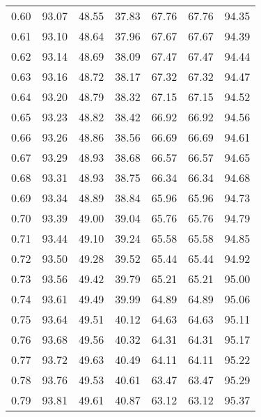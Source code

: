 \begin{tabular}{|c|c|c|c|c|c|c|}
      0.60 &     93.07 &     48.55 &      37.83 &   67.76 &      67.76 &         94.35 \\
      0.61 &     93.10 &     48.64 &      37.96 &   67.67 &      67.67 &         94.39 \\
      0.62 &     93.14 &     48.69 &      38.09 &   67.47 &      67.47 &         94.44 \\
      0.63 &     93.16 &     48.72 &      38.17 &   67.32 &      67.32 &         94.47 \\
      0.64 &     93.20 &     48.79 &      38.32 &   67.15 &      67.15 &         94.52 \\
      0.65 &     93.23 &     48.82 &      38.42 &   66.92 &      66.92 &         94.56 \\
      0.66 &     93.26 &     48.86 &      38.56 &   66.69 &      66.69 &         94.61 \\
      0.67 &     93.29 &     48.93 &      38.68 &   66.57 &      66.57 &         94.65 \\
      0.68 &     93.31 &     48.93 &      38.75 &   66.34 &      66.34 &         94.68 \\
      0.69 &     93.34 &     48.89 &      38.84 &   65.96 &      65.96 &         94.73 \\
      0.70 &     93.39 &     49.00 &      39.04 &   65.76 &      65.76 &         94.79 \\
      0.71 &     93.44 &     49.10 &      39.24 &   65.58 &      65.58 &         94.85 \\
      0.72 &     93.50 &     49.28 &      39.52 &   65.44 &      65.44 &         94.92 \\
      0.73 &     93.56 &     49.42 &      39.79 &   65.21 &      65.21 &         95.00 \\
      0.74 &     93.61 &     49.49 &      39.99 &   64.89 &      64.89 &         95.06 \\
      0.75 &     93.64 &     49.51 &      40.12 &   64.63 &      64.63 &         95.11 \\
      0.76 &     93.68 &     49.56 &      40.32 &   64.31 &      64.31 &         95.17 \\
      0.77 &     93.72 &     49.63 &      40.49 &   64.11 &      64.11 &         95.22 \\
      0.78 &     93.76 &     49.53 &      40.61 &   63.47 &      63.47 &         95.29 \\
      0.79 &     93.81 &     49.61 &      40.87 &   63.12 &      63.12 &         95.37 \\

\end{tabular}
